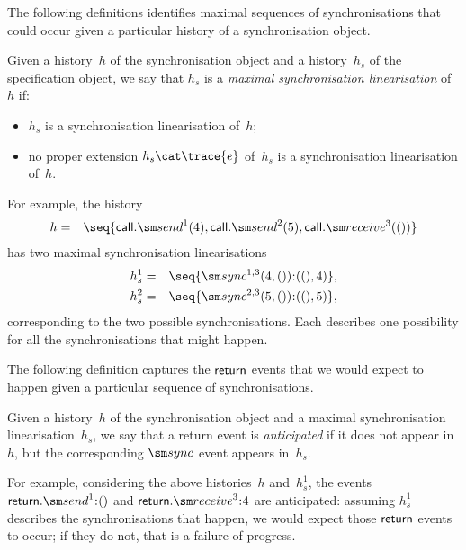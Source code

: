 
The following definitions identifies maximal sequences of synchronisations
that could occur given a particular history of a synchronisation object.
%
\begin{definition}
Given a history~$h$ of the synchronisation object and a history~$h_s$ of the
specification object, we say that $h_s$ is a \emph{maximal synchronisation
  linearisation} of~$h$ if:
\begin{itemize}
\item $h_s$ is a synchronisation linearisation of~$h$;

\item no proper extension $h_s \cat \trace{e}$ of~$h_s$ is a synchronisation
  linearisation of~$h$.
\end{itemize}
\end{definition}
%
For example, the history 
\begin{eqnarray*}
h & = &\seq{\call.\send^1(4), \call.\send^2(5), \call.\receive^3(())}
\end{eqnarray*}
has two maximal synchronisation linearisations
\begin{eqnarray*}
h_s^1 & = &  \seq{\sync^{1,3}(4,())\::((),4)}, \\
h_s^2 & = & \seq{\sync^{2,3}(5,())\::((),5)},
\end{eqnarray*}
corresponding to the two possible synchronisations.  Each describes one
possibility for all the synchronisations that might happen. 


The following definition captures the $\mathsf{return}$ events that we would expect to
happen given a particular sequence of synchronisations.
%
\begin{definition}
Given a history~$h$ of the synchronisation object and a maximal
synchronisation linearisation~$h_s$, we say that a return event is
\emph{anticipated} if it does not appear in~$h$, but the corresponding $\sync$
event appears in~$h_s$.
\end{definition}
%
For example, considering the above histories~$h$ and~$h_s^1$, the events
$\return.\send^1\::()$ and $\return.\receive^3\::4$ are anticipated: assuming
$h_s^1$ describes the synchronisations that happen, we would expect those
$\mathsf{return}$ events to occur; if they do not, that is a failure of progress.  


